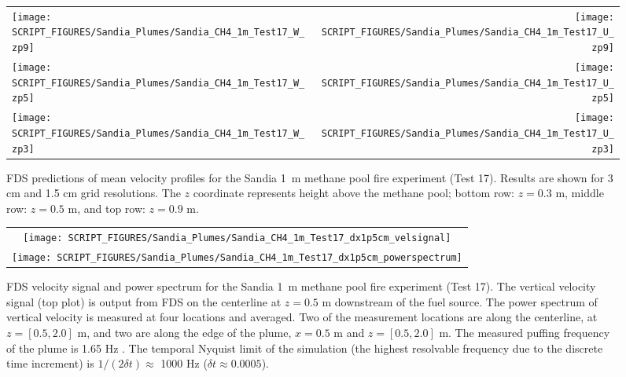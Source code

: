 \begin{figure}[p]
\begin{tabular*}{\textwidth}{l@{\extracolsep{\fill}}r}
\texttt{[image: SCRIPT\_FIGURES/Sandia\_Plumes/Sandia\_CH4\_1m\_Test17\_W\_zp9]} &
\texttt{[image: SCRIPT\_FIGURES/Sandia\_Plumes/Sandia\_CH4\_1m\_Test17\_U\_zp9]} \\
\texttt{[image: SCRIPT\_FIGURES/Sandia\_Plumes/Sandia\_CH4\_1m\_Test17\_W\_zp5]} &
\texttt{[image: SCRIPT\_FIGURES/Sandia\_Plumes/Sandia\_CH4\_1m\_Test17\_U\_zp5]} \\
\texttt{[image: SCRIPT\_FIGURES/Sandia\_Plumes/Sandia\_CH4\_1m\_Test17\_W\_zp3]} &
\texttt{[image: SCRIPT\_FIGURES/Sandia\_Plumes/Sandia\_CH4\_1m\_Test17\_U\_zp3]}
\end{tabular*}
\caption[Sandia 1~m methane pool fire (Test 17) mean velocity profiles]
{FDS predictions of mean velocity profiles for the Sandia 1~m methane pool fire experiment (Test 17). Results are shown for 3 cm and 1.5 cm grid resolutions. The $z$ coordinate represents height above the methane pool; bottom row: $z=0.3$ m, middle row: $z=0.5$ m, and top row: $z=0.9$ m.}
\label{Sandia_CH4_1m_Test17_velocity}
\end{figure}

\begin{figure}[p]
\begin{center}
\begin{tabular}{c}
\texttt{[image: SCRIPT\_FIGURES/Sandia\_Plumes/Sandia\_CH4\_1m\_Test17\_dx1p5cm\_velsignal]} \\
\texttt{[image: SCRIPT\_FIGURES/Sandia\_Plumes/Sandia\_CH4\_1m\_Test17\_dx1p5cm\_powerspectrum]}
\end{tabular}
\end{center}
\caption[Sandia 1~m methane pool fire velocity signal and power spectrum]
{FDS velocity signal and power spectrum for the Sandia 1~m methane pool fire experiment (Test 17).  The vertical velocity signal (top plot) is output from FDS on the centerline at $z=0.5$ m downstream of the fuel source.  The power spectrum of vertical velocity is measured at four locations and averaged.  Two of the measurement locations are along the centerline, at $z=[0.5, 2.0]$ m, and two are along the edge of the plume, $x = 0.5$ m and $z=[0.5, 2.0]$ m.  The measured puffing frequency of the plume is 1.65 Hz \cite{Tieszen:2002}.  The temporal Nyquist limit of the simulation (the highest resolvable frequency due to the discrete time increment) is $1/(2\delta t) \approx$ 1000 Hz ($\delta t \approx 0.0005$).}
\label{Sandia_CH4_1m_Test17_spectrum}
\end{figure}

